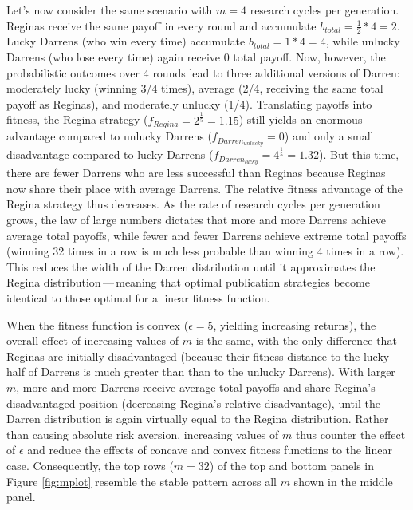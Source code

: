 \documentclass[
  ,man,mask,floatsintext]{apa6}
\begin{document}
Let's now consider the same scenario with \(m = 4\) research cycles per generation.
Reginas receive the same payoff in every round and accumulate \(b_{total} = \frac{1}{2} * 4 = 2\).
Lucky Darrens (who win every time) accumulate \(b_{total} = 1*4 = 4\), while unlucky Darrens (who lose every time) again receive 0 total payoff.
Now, however, the probabilistic outcomes over 4 rounds lead to three additional versions of Darren: moderately lucky (winning 3/4 times), average (2/4, receiving the same total payoff as Reginas), and moderately unlucky (1/4).
Translating payoffs into fitness, the Regina strategy (\(f_{Regina} = 2^\frac{1}{5} = 1.15\)) still yields an enormous advantage compared to unlucky Darrens (\(f_{Darren_{unlucky}} = 0\)) and only a small disadvantage compared to lucky Darrens (\(f_{Darren_{lucky}} = 4^\frac{1}{5} = 1.32\)).
But this time, there are fewer Darrens who are less successful than Reginas because Reginas now share their place with average Darrens.
The relative fitness advantage of the Regina strategy thus decreases.
As the rate of research cycles per generation grows, the law of large numbers dictates that more and more Darrens achieve average total payoffs, while fewer and fewer Darrens achieve extreme total payoffs (winning 32 times in a row is much less probable than winning 4 times in a row).
This reduces the width of the Darren distribution until it approximates the Regina distribution\(\,\)---\(\,\)meaning that optimal publication strategies become identical to those optimal for a linear fitness function.

When the fitness function is convex (\(\epsilon = 5\), yielding increasing returns), the overall effect of increasing values of \(m\) is the same, with the only difference that Reginas are initially disadvantaged (because their fitness distance to the lucky half of Darrens is much greater than than to the unlucky Darrens).
With larger \(m\), more and more Darrens receive average total payoffs and share Regina's disadvantaged position (decreasing Regina's relative disadvantage), until the Darren distribution is again virtually equal to the Regina distribution.
Rather than causing absolute risk aversion, increasing values of \(m\) thus counter the effect of \(\epsilon\) and reduce the effects of concave and convex fitness functions to the linear case.
Consequently, the top rows (\(m = 32\)) of the top and bottom panels in Figure \ref{fig:mplot} resemble the stable pattern across all \(m\) shown in the middle panel.
\end{document}
